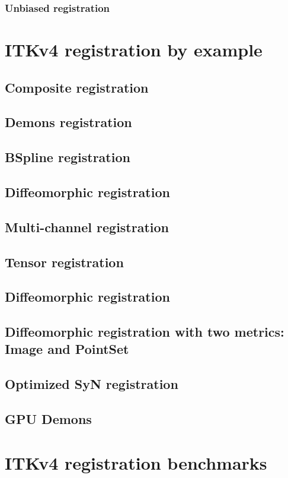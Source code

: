 \documentclass{llncs}
\begin{document}
\subsubsection{Unbiased registration}

\section{ITKv4 registration by example}

\subsection{Composite registration}
\subsection{Demons registration}
\subsection{BSpline registration}
\subsection{Diffeomorphic registration}
\subsection{Multi-channel registration}
\subsection{Tensor registration}
\subsection{Diffeomorphic registration}
\subsection{Diffeomorphic registration with two metrics: Image and
  PointSet}
\subsection{Optimized SyN registration}

\subsection{GPU Demons}

\section{ITKv4 registration benchmarks}
\end{document}
